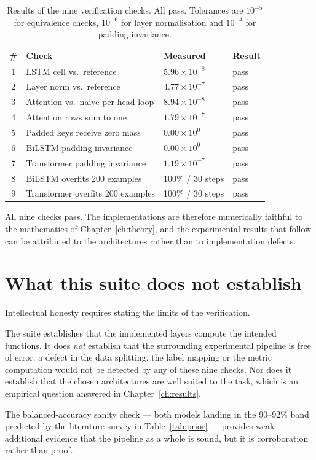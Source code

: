 \begin{table}[ht]
\centering
\caption[Verification results]{Results of the nine verification checks. All pass. Tolerances are
$10^{-5}$ for equivalence checks, $10^{-6}$ for layer normalisation and $10^{-4}$ for padding
invariance.}
\label{tab:verification}
\begin{tabular}{clll}
\toprule
\textbf{\#} & \textbf{Check} & \textbf{Measured} & \textbf{Result} \\
\midrule
1 & LSTM cell vs.\ reference            & $5.96\times10^{-8}$ & pass \\
2 & Layer norm vs.\ reference           & $4.77\times10^{-7}$ & pass \\
3 & Attention vs.\ naive per-head loop  & $8.94\times10^{-8}$ & pass \\
4 & Attention rows sum to one           & $1.79\times10^{-7}$ & pass \\
5 & Padded keys receive zero mass       & $0.00\times10^{0}$  & pass \\
6 & BiLSTM padding invariance           & $0.00\times10^{0}$  & pass \\
7 & Transformer padding invariance      & $1.19\times10^{-7}$ & pass \\
8 & BiLSTM overfits 200 examples        & 100\% / 30 steps    & pass \\
9 & Transformer overfits 200 examples   & 100\% / 30 steps    & pass \\
\bottomrule
\end{tabular}
\end{table}

All nine checks pass. The implementations are therefore numerically faithful to the mathematics of
Chapter~\ref{ch:theory}, and the experimental results that follow can be attributed to the
architectures rather than to implementation defects.

\section{What this suite does not establish}

Intellectual honesty requires stating the limits of the verification.

The suite establishes that the implemented layers compute the intended functions. It does
\emph{not} establish that the surrounding experimental pipeline is free of error: a defect in the
data splitting, the label mapping or the metric computation would not be detected by any of these
nine checks. Nor does it establish that the chosen architectures are well suited to the task, which
is an empirical question answered in Chapter~\ref{ch:results}.

The balanced-accuracy sanity check --- both models landing in the 90--92\% band predicted by the
literature survey in Table~\ref{tab:prior} --- provides weak additional evidence that the pipeline
as a whole is sound, but it is corroboration rather than proof.
